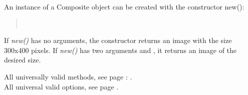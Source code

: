 \begin{Constructor} 
An instance of a Composite object can be created with the constructor new():
\begin{quote}
\parindent 0pt
\\
\end{quote}
If \textit{new()} has no arguments, 
the constructor returns an image with the size 300x400 pixels. 
If \textit{new()} has two arguments  and , 
it returns an image of the desired size.
\end{Constructor}

\Methods
All universally valid methods, see page \pageref{methods}: . \\

\Attributes
All universal valid options, see page \pageref{options}. 

